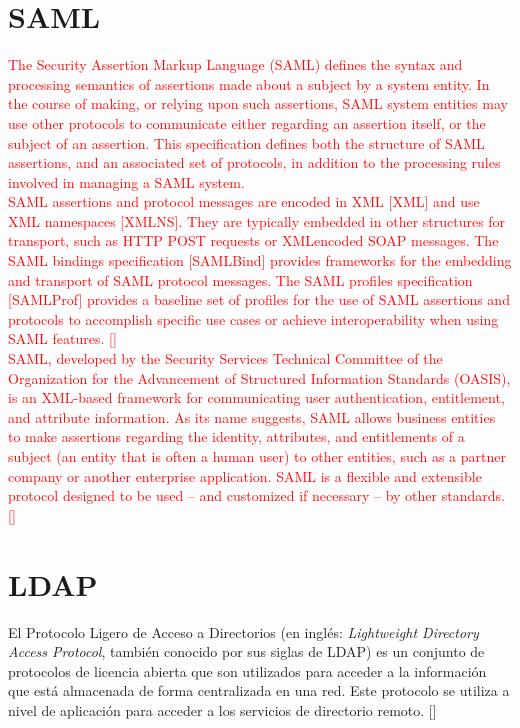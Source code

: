 \section{SAML}
\textcolor{red}{ The Security Assertion Markup Language (SAML) defines the syntax and processing semantics of
assertions made about a subject by a system entity. In the course of making, or relying upon such
assertions, SAML system entities may use other protocols to communicate either regarding an assertion
itself, or the subject of an assertion. This specification defines both the structure of SAML assertions, and
an associated set of protocols, in addition to the processing rules involved in managing a SAML system.\\
SAML assertions and protocol messages are encoded in XML [XML] and use XML namespaces [XMLNS].
They are typically embedded in other structures for transport, such as HTTP POST requests or XMLencoded SOAP messages. The SAML bindings specification [SAMLBind] provides frameworks for the
embedding and transport of SAML protocol messages. The SAML profiles specification [SAMLProf]
provides a baseline set of profiles for the use of SAML assertions and protocols to accomplish specific
use cases or achieve interoperability when using SAML features.
[\cite{philpott2015assertions}]
\\
SAML, developed by the Security Services Technical Committee of the Organization for the Advancement of Structured Information Standards (OASIS), is an XML-based framework for communicating user authentication, entitlement, and attribute information. As its name suggests, SAML allows business entities to make assertions regarding the identity, attributes, and entitlements of a subject (an entity that is often a human user) to other entities, such as a partner company or another enterprise application. SAML is a flexible and extensible protocol designed to be used – and customized if necessary
– by other standards. [\cite{wisniewski2005saml}]}

\section{LDAP}
El Protocolo Ligero de Acceso a Directorios (en inglés: \textit{Lightweight Directory Access Protocol}, también conocido por sus siglas de LDAP) es un conjunto de protocolos de licencia abierta que son utilizados para acceder a la información que está almacenada de forma centralizada en una red. Este protocolo se utiliza a nivel de aplicación para acceder a los servicios de directorio remoto. [\cite{ldap-doc}]

